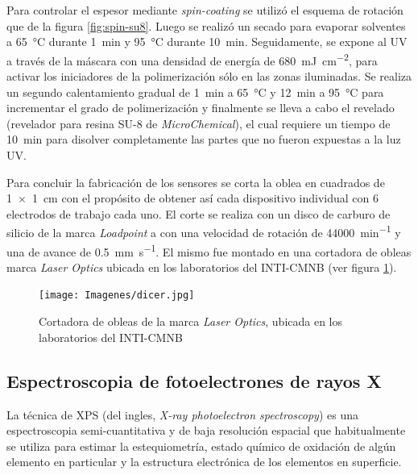 		Para controlar el espesor mediante \textit{spin-coating} se utilizó el esquema de rotación que de la figura \ref{fig:spin-su8}. Luego se realizó un secado para evaporar solventes a \SI{65}{\celsius} durante \SI{1}{\minute} y \SI{95}{\celsius} durante \SI{10}{\minute}. Seguidamente, se expone al UV a través de la máscara con una densidad de energía de \SI{680}{mJ.cm^{-2}}, para activar los iniciadores de la polimerización sólo en las zonas iluminadas. Se realiza un segundo calentamiento gradual de \SI{1}{\minute} a \SI{65}{\celsius} y \SI{12}{\minute} a \SI{95}{\celsius} para incrementar el grado de polimerización y finalmente se lleva a cabo el revelado (revelador para resina SU-8 de \textit{MicroChemical}), el cual requiere un tiempo de \SI{10}{\minute} para disolver completamente las partes que no fueron expuestas a la luz UV. 
		
		Para concluir la fabricación de los sensores se corta la oblea en cuadrados de \SI{1x1}{\cm} con el propósito de obtener así cada dispositivo individual con 6 electrodos de trabajo cada uno. El corte se realiza con un disco de carburo de silicio de la marca \textit{Loadpoint} a con una velocidad de rotación de \SI{44000}{\minute^{-1}} y una de avance de \SI{0.5}{\mm\per\second}. El mismo fue montado en una cortadora de obleas marca \textit{Laser Optics} ubicada en los laboratorios del INTI-CMNB (ver figura \ref{fig:dicer}).

			\begin{figure}[h!]
			 		  \begin{center}
			 		  \texttt{[image: Imagenes/dicer.jpg]}
			 		  \caption[Cortadora de obleas]{Cortadora de obleas de la marca \textit{Laser Optics}, ubicada en los laboratorios del INTI-CMNB}
			 		  \label{fig:dicer}
			 		  \end{center}
			 		  \end{figure}
		
	
	\subsection{Espectroscopia de fotoelectrones de rayos X}

		La técnica de XPS (del ingles, \textit {X-ray photoelectron spectroscopy}) es una espectroscopia semi-cuantitativa y de baja resolución espacial que habitualmente se utiliza para estimar la estequiometría, estado químico de oxidación de algún elemento en particular y la estructura electrónica de los elementos en superficie.\cite{siegbahn1956,siegbahn1981}


